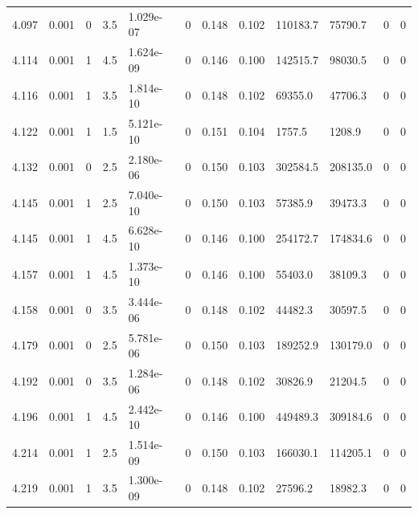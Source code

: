 \documentclass[preview]{standalone}
\begin{document}
{{{{{{{{{\begin{tabular}{L{1.2cm}C{1.2cm} C{0.3cm}C{0.5cm} C{1.4cm}C{1.4cm} C{1.4cm}C{1.4cm} C{1.6cm}C{1.6cm} C{1.6cm}C{1.6cm}}
  4.097  &  0.001  & 0     & 3.5 &  1.029e-07  & 0  &  0.148&   0.102& 110183.7 & 75790.7   &  0 & 0  \\ 
  4.114  &  0.001  & 1     & 4.5 &  1.624e-09  & 0  &  0.146&   0.100& 142515.7 & 98030.5   &  0 & 0  \\ 
  4.116  &  0.001  & 1     & 3.5 &  1.814e-10  & 0  &  0.148&   0.102& 69355.0 & 47706.3   &  0 & 0  \\ 
  4.122  &  0.001  & 1     & 1.5 &  5.121e-10  & 0  &  0.151&   0.104& 1757.5 & 1208.9   &  0 & 0  \\ 
  4.132  &  0.001  & 0     & 2.5 &  2.180e-06  & 0  &  0.150&   0.103& 302584.5 & 208135.0   &  0 & 0  \\ 
  4.145  &  0.001  & 1     & 2.5 &  7.040e-10  & 0  &  0.150&   0.103& 57385.9 & 39473.3   &  0 & 0  \\ 
  4.145  &  0.001  & 1     & 4.5 &  6.628e-10  & 0  &  0.146&   0.100& 254172.7 & 174834.6   &  0 & 0  \\ 
  4.157  &  0.001  & 1     & 4.5 &  1.373e-10  & 0  &  0.146&   0.100& 55403.0 & 38109.3   &  0 & 0  \\ 
  4.158  &  0.001  & 0     & 3.5 &  3.444e-06  & 0  &  0.148&   0.102& 44482.3 & 30597.5   &  0 & 0  \\ 
  4.179  &  0.001  & 0     & 2.5 &  5.781e-06  & 0  &  0.150&   0.103& 189252.9 & 130179.0   &  0 & 0  \\ 
  4.192  &  0.001  & 0     & 3.5 &  1.284e-06  & 0  &  0.148&   0.102& 30826.9 & 21204.5   &  0 & 0  \\ 
  4.196  &  0.001  & 1     & 4.5 &  2.442e-10  & 0  &  0.146&   0.100& 449489.3 & 309184.6   &  0 & 0  \\ 
  4.214  &  0.001  & 1     & 2.5 &  1.514e-09  & 0  &  0.150&   0.103& 166030.1 & 114205.1   &  0 & 0  \\ 
  4.219  &  0.001  & 1     & 3.5 &  1.300e-09  & 0  &  0.148&   0.102& 27596.2 & 18982.3   &  0 & 0  \\ 
\hline 
\end{tabular} 

}}}}}}}}}
\end{document}
